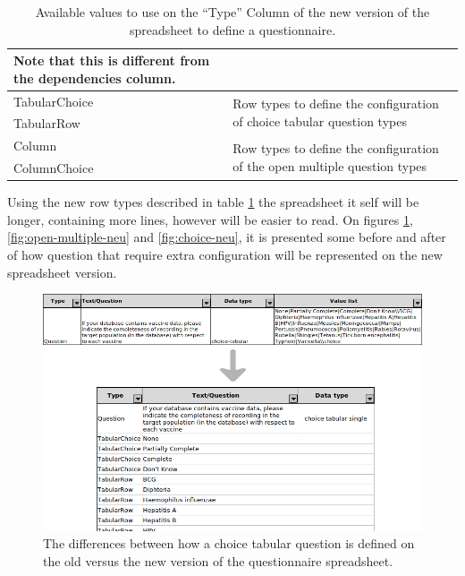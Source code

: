 \begin{table}[H]
\begin{tabular}{| p{.2\linewidth} | p{.8\linewidth} |}
        Note that this is different from the dependencies column. \\ \hline
TabularChoice                 & \multirow{2}{*}{Row types to define the configuration of choice tabular question types}    \\ \cline{1-1}
TabularRow                    &                                                                                            \\ \hline
Column                        & \multirow{2}{*}{Row types to define the configuration of the open multiple question types} \\ \cline{1-1}
ColumnChoice                  &                                                                                            \\ \hline
\end{tabular}
\caption{Available values to use on the ``Type'' Column of the new version of the spreadsheet to define a questionnaire.}
\label{tab:excel-row-types}
\end{table}

Using the new row types described in table \ref{tab:excel-row-types} the spreadsheet it self will be longer, containing more lines, however will be easier to read.
On figures \ref{fig:choice-tabular-neu}, \ref{fig:open-multiple-neu} and \ref{fig:choice-neu}, it is presented some before and after of how question that require extra configuration will be represented on the new spreadsheet version.

\begin{figure}
    \center
    \includegraphics[width=.75\textwidth]{choice-tabular-neu}
    \caption{The differences between how a choice tabular question is defined on the old versus the new version of the questionnaire spreadsheet.}
    \label{fig:choice-tabular-neu}
\end{figure}


